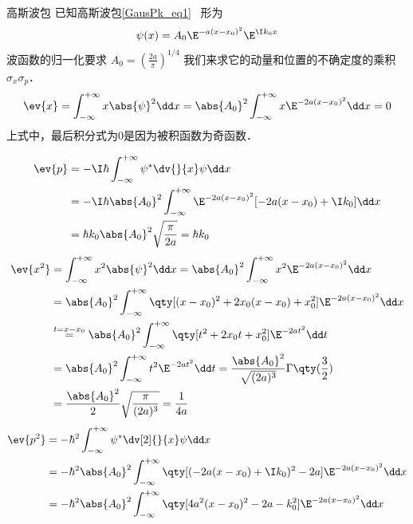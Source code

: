 \begin{example}{高斯波包}\label{Uncert_ex1}
已知高斯波包\autoref{GausPk_eq1}~ 形为
\begin{equation}
\psi(x)=A_0\E^{-a(x-x_0)^2}\E^{\I k_0x}
\end{equation}
波函数的归一化要求 $A_0=(\frac{2a}{\pi})^{1/4}$
我们来求它的动量和位置的不确定度的乘积 $\sigma_x\sigma_p$．
\begin{equation}\label{Uncert_eq4}
\ev{x}=\int_{-\infty}^{+\infty}x\abs{\psi}^2\dd x=\abs{A_0}^2\int_{-\infty}^{+\infty}x\E^{-2a(x-x_0)^2}\dd x=0
\end{equation}
上式中，最后积分式为0是因为被积函数为奇函数．

\begin{equation}
\begin{aligned}
\ev{p}&=-\I\hbar\int_{-\infty}^{+\infty}\psi^{*}\dv{}{x}\psi\dd x\\
&=-\I\hbar\abs{A_0}^2\int_{-\infty}^{+\infty}\E^{-2a(x-x_0)^2}[-2a(x-x_0)+\I k_0]\dd x\\
&=\hbar k_0\abs{A_0}^2\sqrt{\frac{\pi}{2a}}=\hbar k_0
\end{aligned}
\end{equation}
\begin{equation}
\begin{aligned}
\ev{x^2}&=\int_{-\infty}^{+\infty}x^2\abs{\psi}^2\dd x=\abs{A_0}^2\int_{-\infty}^{+\infty}x^2\E^{-2a(x-x_0)^2}\dd x\\
&=\abs{A_0}^2\int_{-\infty}^{+\infty}\qty[(x-x_0)^2+2x_0(x-x_0)+x_0^2]\E^{-2a(x-x_0)^2}\dd x\\
&\overset{t=x-x_0}{=}\abs{A_0}^2\int_{-\infty}^{+\infty}\qty[t^2+2x_0t+x_0^2]\E^{-2at^2}\dd t\\
&=\abs{A_0}^2\int_{-\infty}^{+\infty}t^2\E^{-2at^2}\dd t
=\frac{\abs{A_0}^2}{\sqrt{(2a)^3}}\Gamma\qty(\frac{3}{2})\\
&=\frac{\abs{A_0}^2}{2}\sqrt{\frac{\pi}{(2a)^3}}=\frac{1}{4a}
\end{aligned}
\end{equation}
\begin{equation}
\begin{aligned}
\ev{p^2}&=-\hbar^2 \int_{-\infty}^{+\infty}\psi^{*}\dv[2]{}{x}\psi\dd x\\
&=-\hbar^2\abs{A_0}^2\int_{-\infty}^{+\infty}\qty[(-2a(x-x_0)+\I k_0)^2-2a]\E^{-2a(x-x_0)^2}\dd x\\
&=-\hbar^2\abs{A_0}^2\int_{-\infty}^{+\infty}\qty[4a^2(x-x_0)^2-2a-k_0^2]\E^{-2a(x-x_0)^2}\dd x\\

\end{aligned}
\end{equation}
\end{example}
